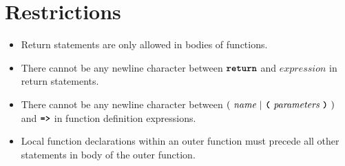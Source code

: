 \section*{Restrictions}

\begin{itemize}
\item Return statements are only allowed in bodies of functions.
\item There cannot be any newline character between
$\textbf{\texttt{return}}$ and $\textit{expression}$ in return statements.
\item There cannot be any newline character between
  $(\ \textit{name}\ | \ \textbf{\texttt{(}}\ \textit{parameters}\ \textbf{\texttt{)}}\ )$
                                               and
$\texttt{\textbf{=>}}$ in function definition expressions.
\item Local function declarations within an outer function
  must precede all other statements in body of the outer function.
\end{itemize}
